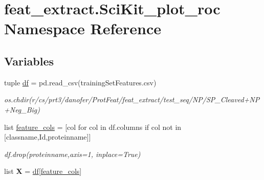 \hypertarget{namespacefeat__extract_1_1_sci_kit__plot__roc}{}\section{feat\+\_\+extract.\+Sci\+Kit\+\_\+plot\+\_\+roc Namespace Reference}
\label{namespacefeat__extract_1_1_sci_kit__plot__roc}
\subsection*{Variables}
\begin{DoxyCompactItemize}
\item 
\hypertarget{namespacefeat__extract_1_1_sci_kit__plot__roc_a03784c27a1a2c5022ca5b0b2c2c417a3}{}tuple \hyperlink{namespacefeat__extract_1_1_sci_kit__plot__roc_a03784c27a1a2c5022ca5b0b2c2c417a3}{df} = pd.\+read\+\_\+csv(\textquotesingle{}training\+Set\+Features.\+csv\textquotesingle{})\label{namespacefeat__extract_1_1_sci_kit__plot__roc_a03784c27a1a2c5022ca5b0b2c2c417a3}

\begin{DoxyCompactList}\small\item\em os.\+chdir(r\textquotesingle{}/cs/prt3/danofer/\+Prot\+Feat/feat\+\_\+extract/test\+\_\+seq/\+N\+P/\+S\+P\+\_\+\+Cleaved+\+N\+P+\+Neg\+\_\+\+Big\textquotesingle{}) \end{DoxyCompactList}\item 
\hypertarget{namespacefeat__extract_1_1_sci_kit__plot__roc_a2dbfb1de33281afe0149c10700c83868}{}list \hyperlink{namespacefeat__extract_1_1_sci_kit__plot__roc_a2dbfb1de33281afe0149c10700c83868}{feature\+\_\+cols} = \mbox{[}col for col in df.\+columns if col not in \mbox{[}\textquotesingle{}classname\textquotesingle{},\textquotesingle{}Id\textquotesingle{},\textquotesingle{}proteinname\textquotesingle{}\mbox{]}\mbox{]}\label{namespacefeat__extract_1_1_sci_kit__plot__roc_a2dbfb1de33281afe0149c10700c83868}

\begin{DoxyCompactList}\small\item\em df.\+drop(\textquotesingle{}proteinname\textquotesingle{},axis=1, inplace=True) \end{DoxyCompactList}\item 
\hypertarget{namespacefeat__extract_1_1_sci_kit__plot__roc_af67c2ce466362b9da41b1b96c372931f}{}list {\bfseries X} = \hyperlink{namespacefeat__extract_1_1_sci_kit__plot__roc_a03784c27a1a2c5022ca5b0b2c2c417a3}{df}\mbox{[}\hyperlink{namespacefeat__extract_1_1_sci_kit__plot__roc_a2dbfb1de33281afe0149c10700c83868}{feature\+\_\+cols}\mbox{]}\label{namespacefeat__extract_1_1_sci_kit__plot__roc_af67c2ce466362b9da41b1b96c372931f}


\end{DoxyCompactItemize}
